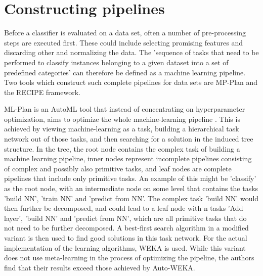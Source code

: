 \section{Constructing pipelines}
Before a classifier is evaluated on a data set, often a number of pre-processing steps are executed first. These could include selecting promising features and discarding other and normalizing the data. The 'sequence of tasks that need to be performed to classify instances belonging to a given dataset into a set of predefined categories' \cite{DBLP:conf/eurogp/SaPOP17} can therefore be defined as a machine learning pipeline. Two tools which construct such complete pipelines for data sets are MP-Plan and the RECIPE framework.

ML-Plan is an AutoML tool that instead of concentrating on hyperparameter optimization, aims to optimize the whole machine-learning pipeline \cite{wever2017automatic}. This is achieved by viewing machine-learning as a task, building a hierarchical task network out of those tasks, and then searching for a solution in the induced tree structure. In the tree, the root node contains the complex task of building a machine learning pipeline, inner nodes represent incomplete pipelines consisting of complex and possibly also primitive tasks, and leaf nodes are complete pipelines that include only primitive tasks. An example of this might be 'classify' as the root node, with an intermediate node on some level that contains the tasks 'build NN', 'train NN' and 'predict from NN'. The complex task 'build NN' would then further be decomposed, and could lead to a leaf node with n tasks 'Add layer', 'build NN' and 'predict from NN', which are all primitive tasks that do not need to be further decomposed. A best-first search algorithm in a modified variant is then used to find good solutions in this task network. For the actual implementation of the learning algorithms, WEKA is used. While this variant does not use meta-learning in the process of optimizing the pipeline, the authors find that their results exceed those achieved by Auto-WEKA.\\

